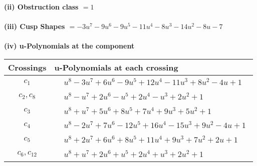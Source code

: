 \documentclass[1p]{elsarticle_modified}
\theoremstyle{definition}
\begin{document}
\flushleft \textbf{(ii) Obstruction class $= 1$}\\~\\
\flushleft \textbf{(iii) Cusp Shapes $= -3 u^7-9 u^6-9 u^5-11 u^4-8 u^3-14 u^2-8 u-7$}\\~\\
\newpage\renewcommand{\arraystretch}{1}
\flushleft \textbf{(iv) u-Polynomials at the component}\newline \\
\begin{tabular}{m{50pt}|m{274pt}}
Crossings & \hspace{64pt}u-Polynomials at each crossing \\
\hline $$\begin{aligned}c_{1}\end{aligned}$$&$\begin{aligned}
&u^8-3 u^7+6 u^6-9 u^5+12 u^4-11 u^3+8 u^2-4 u+1
\end{aligned}$\\
\hline $$\begin{aligned}c_{2},c_{8}\end{aligned}$$&$\begin{aligned}
&u^8- u^7+2 u^6- u^5+2 u^4- u^3+2 u^2+1
\end{aligned}$\\
\hline $$\begin{aligned}c_{3}\end{aligned}$$&$\begin{aligned}
&u^8+u^7+5 u^6+8 u^5+7 u^4+9 u^3+5 u^2+1
\end{aligned}$\\
\hline $$\begin{aligned}c_{4}\end{aligned}$$&$\begin{aligned}
&u^8-2 u^7+7 u^6-12 u^5+16 u^4-15 u^3+9 u^2-4 u+1
\end{aligned}$\\
\hline $$\begin{aligned}c_{5}\end{aligned}$$&$\begin{aligned}
&u^8+2 u^7+6 u^6+8 u^5+11 u^4+9 u^3+7 u^2+2 u+1
\end{aligned}$\\
\hline $$\begin{aligned}c_{6},c_{12}\end{aligned}$$&$\begin{aligned}
&u^8+u^7+2 u^6+u^5+2 u^4+u^3+2 u^2+1
\end{aligned}$\\

\end{tabular}
\end{document}
